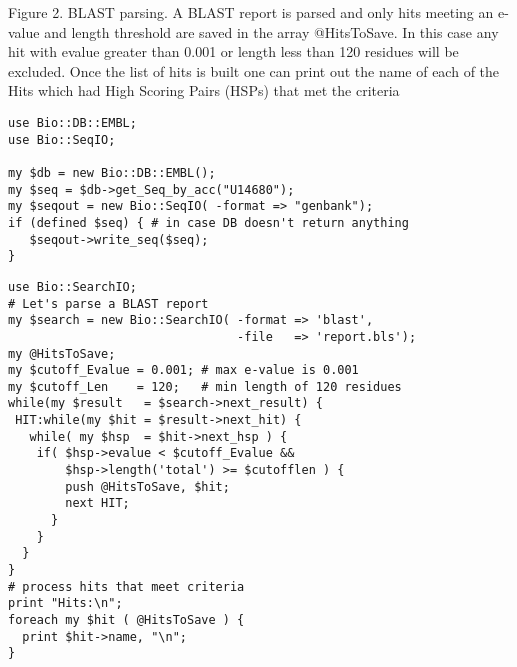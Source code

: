 \documentclass[12pt]{article}
\begin{document}
\newpage


Figure 2. BLAST parsing. A BLAST report is parsed and only hits meeting
an e-value and length threshold are saved in the array @HitsToSave.  
In this case any hit with evalue greater than 0.001 or length less 
than 120 residues will be excluded.  Once the list of hits is built 
one can print out the name of each of the Hits which had High Scoring
Pairs (HSPs) that met the criteria

\newpage

\singlespacing

\begin{verbatim}
use Bio::DB::EMBL;
use Bio::SeqIO;

my $db = new Bio::DB::EMBL();
my $seq = $db->get_Seq_by_acc("U14680");
my $seqout = new Bio::SeqIO( -format => "genbank");
if (defined $seq) { # in case DB doesn't return anything
   $seqout->write_seq($seq);
}
\end{verbatim}

\newpage

\begin{verbatim}
use Bio::SearchIO;
# Let's parse a BLAST report 
my $search = new Bio::SearchIO( -format => 'blast',
                                -file   => 'report.bls');
my @HitsToSave;
my $cutoff_Evalue = 0.001; # max e-value is 0.001
my $cutoff_Len    = 120;   # min length of 120 residues
while(my $result   = $search->next_result) {
 HIT:while(my $hit = $result->next_hit) {
   while( my $hsp  = $hit->next_hsp ) {
    if( $hsp->evalue < $cutoff_Evalue && 
        $hsp->length('total') >= $cutofflen ) { 
        push @HitsToSave, $hit;
        next HIT;
      } 
    }
  }
}
# process hits that meet criteria
print "Hits:\n";
foreach my $hit ( @HitsToSave ) {
  print $hit->name, "\n";	
}

\end{verbatim}
\end{document}

